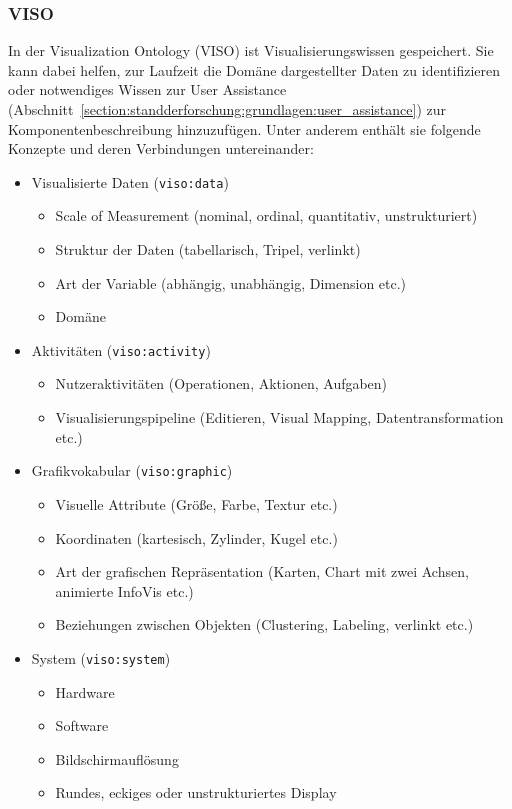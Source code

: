 \documentclass[
	headsepline,
	footsepline,
	fontsize=12pt,
	bibliography=totoc
]{scrbook}
\begin{document}
\subsubsection{VISO}
\label{section:standderforschung:grundlagen:cruise_vizboard:viso}

In der Visualization Ontology (VISO) ist Visualisierungswissen gespeichert. Sie kann dabei helfen, zur Laufzeit die Domäne dargestellter Daten zu identifizieren oder notwendiges Wissen zur User Assistance (Abschnitt~\ref{section:standderforschung:grundlagen:user_assistance}) zur Komponentenbeschreibung hinzuzufügen. Unter anderem enthält sie folgende Konzepte und deren Verbindungen untereinander:

\begin{itemize}
	\item Visualisierte Daten (\texttt{viso:data})
	\begin{itemize}
		\item Scale of Measurement (nominal, ordinal, quantitativ, unstrukturiert)
		\item Struktur der Daten (tabellarisch, Tripel, verlinkt)
		\item Art der Variable (abhängig, unabhängig, Dimension etc.)
		\item Domäne
	\end{itemize}
	\item Aktivitäten (\texttt{viso:activity})
	\begin{itemize}
		\item Nutzeraktivitäten (Operationen, Aktionen, Aufgaben)
		\item Visualisierungspipeline (Editieren, Visual Mapping, Datentransformation etc.)
	\end{itemize}
	\item Grafikvokabular (\texttt{viso:graphic})
	\begin{itemize}
		\item Visuelle Attribute (Größe, Farbe, Textur etc.)
		\item Koordinaten (kartesisch, Zylinder, Kugel etc.)
		\item Art der grafischen Repräsentation (Karten, Chart mit zwei Achsen, animierte InfoVis etc.)
		\item Beziehungen zwischen Objekten (Clustering, Labeling, verlinkt etc.)
	\end{itemize}
	\item System (\texttt{viso:system})
	\begin{itemize}
		\item Hardware
		\item Software
		\item Bildschirmauflösung
		\item Rundes, eckiges oder unstrukturiertes Display
	\end{itemize}
\end{itemize}
\end{document}
